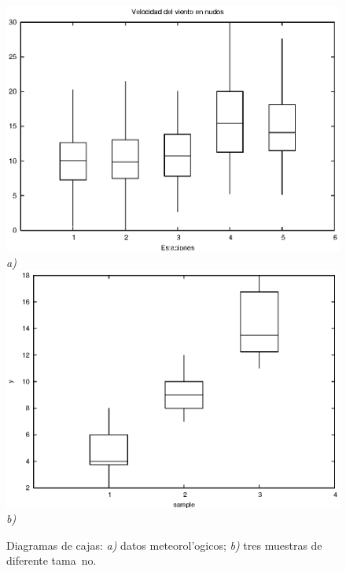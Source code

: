 \documentclass[spanish,12pt,a4paper]{article}
\begin{document}
\begin{description}
\begin{figure}
\begin{center}
\includegraphics[scale=1.0]{boxplot1.eps} \\
\emph{a)} \\ 
\includegraphics[scale=1.0]{boxplot2.eps} \\
\emph{b)} \\
\caption{Diagramas de cajas: \emph{a)} datos meteorol'ogicos; \emph{b)} tres muestras de diferente tama~no.}
\label{fig6}
\end{center}
\end{figure}


\end{description}



\end{document}
